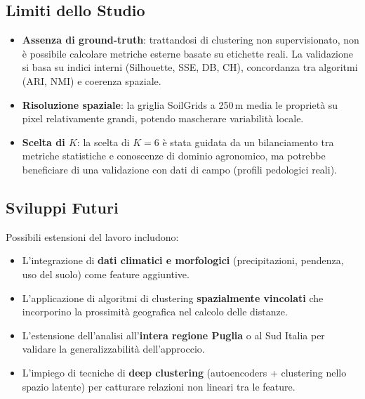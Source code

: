 \documentclass[a4paper,12pt]{article}
\begin{document}
\subsection{Limiti dello Studio}

\begin{itemize}
    \item \textbf{Assenza di ground-truth}: trattandosi di clustering
    non supervisionato, non è possibile calcolare metriche esterne
    basate su etichette reali. La validazione si basa su indici
    interni (Silhouette, SSE, DB, CH), concordanza tra algoritmi
    (ARI, NMI) e coerenza spaziale.

    \item \textbf{Risoluzione spaziale}: la griglia SoilGrids a
    250\,m media le proprietà su pixel relativamente grandi, potendo
    mascherare variabilità locale.

    \item \textbf{Scelta di $K$}: la scelta di $K=6$ è stata guidata
    da un bilanciamento tra metriche statistiche e conoscenze di dominio
    agronomico, ma potrebbe beneficiare di una validazione con dati
    di campo (profili pedologici reali).
\end{itemize}

\subsection{Sviluppi Futuri}

Possibili estensioni del lavoro includono:

\begin{itemize}
    \item L'integrazione di \textbf{dati climatici e morfologici}
    (precipitazioni, pendenza, uso del suolo) come feature aggiuntive.

    \item L'applicazione di algoritmi di clustering
    \textbf{spazialmente vincolati} che incorporino la prossimità
    geografica nel calcolo delle distanze.

    \item L'estensione dell'analisi all'\textbf{intera regione Puglia}
    o al Sud Italia per validare la generalizzabilità dell'approccio.

    \item L'impiego di tecniche di \textbf{deep clustering}
    (autoencoders + clustering nello spazio latente) per catturare
    relazioni non lineari tra le feature.
\end{itemize}
\end{document}
